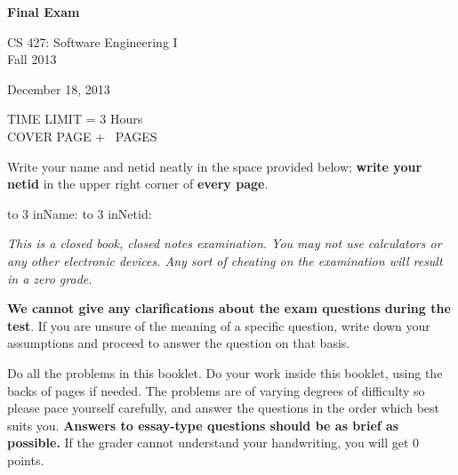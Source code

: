 \documentclass[11pt]{exam}
\begin{document}
  \begin{coverpages}
 \begin{center}
{\Large\textbf{Final Exam}}

 \vspace{0.1 in}

CS 427: Software Engineering I\\ Fall 2013

 \vspace{0.1 in}

December 18, 2013

 \vspace{0.1 in}

TIME LIMIT = 3 Hours \\ COVER PAGE + \numpages\ PAGES \end{center}

 \noindent Write your name and netid neatly in the space provided below; \textbf{write
your netid} in the upper right corner of \textbf{every page}.

 \vspace{0.1 in}

 \hbox to 3 in{Name:\enspace\hrulefill} \hbox to 3 in{Netid:\enspace\hrulefill}

 \vspace{0.1 in}

 \noindent \emph{This is a closed book, closed notes examination. You may not
use calculators or any other electronic devices. Any sort of cheating on the
examination will result in a zero grade.}

 \vspace{0.1 in}

 \noindent \textbf{We cannot give any clarifications about the exam questions
during the test}. If you are unsure of the meaning of a specific question, write
down your assumptions and proceed to answer the question on that basis.

 \vspace{0.1 in}

 \noindent Do all the problems in this booklet. Do your work inside this
booklet, using the backs of pages if needed. The problems are of varying degrees
of difficulty so please pace yourself carefully, and answer the questions in the
order which best suits you. \textbf{Answers to essay-type questions should be as brief
as possible.} If the grader cannot understand your handwriting, you will get 0
points.


\end{coverpages}
\end{document}
